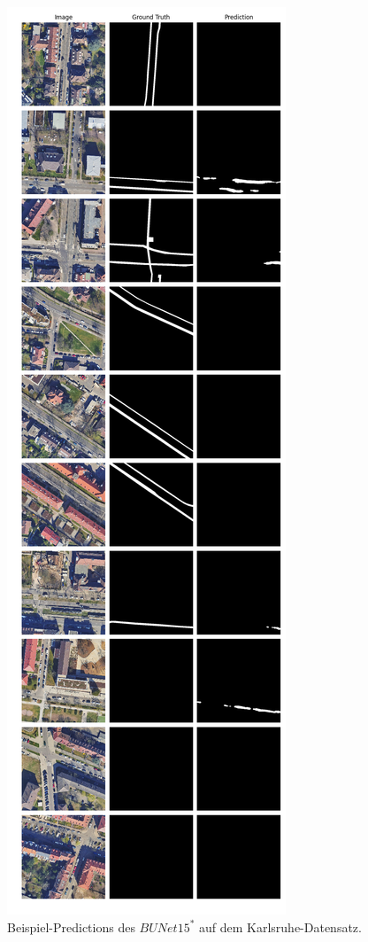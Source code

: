 \begin{figure}
	\centering
	\includegraphics[width=.41\textwidth]{Bilder/Samples-KA/bunet15-s.png} 
	\caption{Beispiel-Predictions des $BUNet15^*$ auf dem Karlsruhe-Datensatz.}
	\label{fig:ka-samples-bunet15-s}
\end{figure}

